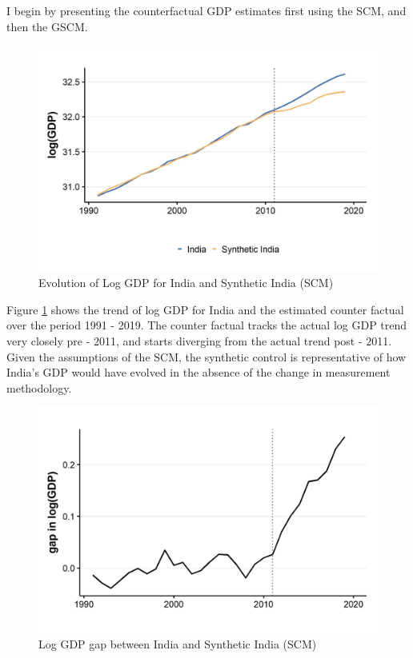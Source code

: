 \documentclass[12pt,nobind, a4paper]{reedthesis}
\begin{document}
 I begin by presenting the counterfactual GDP estimates first using the SCM, and then the GSCM.
 \begin{figure}

 {\centering \includegraphics[width=1\linewidth]{figure/indiasynth} 

 }

 \caption{Evolution of Log GDP for India and Synthetic India (SCM)}\label{fig:indsyn}
 \end{figure}
 Figure \ref{fig:indsyn} shows the trend of log GDP for India and the estimated counter factual over the period 1991 - 2019. The counter factual tracks the actual log GDP trend very closely pre - 2011, and starts diverging from the actual trend post - 2011. Given the assumptions of the SCM, the synthetic control is representative of how India's GDP would have evolved in the absence of the change in measurement methodology.
 \begin{figure}

 {\centering \includegraphics[width=1\linewidth]{figure/indiasynthgap} 

 }

 \caption{Log GDP gap between India and Synthetic India (SCM)}\label{fig:indsyngap}
 \end{figure}
\end{document}
